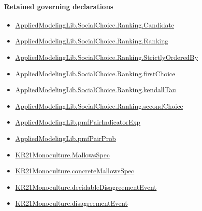 \documentclass[10pt]{article}
\begin{document}
\paragraph{Retained governing declarations}
\begin{itemize}\raggedright
\item \hyperlink{library-prerequisite-8c0e6c25845ae78a}{Applied\allowbreak{}Modeling\allowbreak{}Lib.\allowbreak{}Social\allowbreak{}Choice.\allowbreak{}Ranking.\allowbreak{}Candidate}
\item \hyperlink{library-prerequisite-5cde54446d1ae021}{Applied\allowbreak{}Modeling\allowbreak{}Lib.\allowbreak{}Social\allowbreak{}Choice.\allowbreak{}Ranking.\allowbreak{}Ranking}
\item \hyperlink{library-prerequisite-3585717d1635654a}{Applied\allowbreak{}Modeling\allowbreak{}Lib.\allowbreak{}Social\allowbreak{}Choice.\allowbreak{}Ranking.\allowbreak{}Strictly\allowbreak{}Ordered\allowbreak{}By}
\item \hyperlink{governing-declaration-08e457479ee6cf15}{Applied\allowbreak{}Modeling\allowbreak{}Lib.\allowbreak{}Social\allowbreak{}Choice.\allowbreak{}Ranking.\allowbreak{}first\allowbreak{}Choice}
\item \hyperlink{governing-declaration-127efd44d176e2ba}{Applied\allowbreak{}Modeling\allowbreak{}Lib.\allowbreak{}Social\allowbreak{}Choice.\allowbreak{}Ranking.\allowbreak{}kendall\allowbreak{}Tau}
\item \hyperlink{governing-declaration-25ac37baf58f31e2}{Applied\allowbreak{}Modeling\allowbreak{}Lib.\allowbreak{}Social\allowbreak{}Choice.\allowbreak{}Ranking.\allowbreak{}second\allowbreak{}Choice}
\item \hyperlink{governing-declaration-7bfbb69dcda546c7}{Applied\allowbreak{}Modeling\allowbreak{}Lib.\allowbreak{}pmf\allowbreak{}Pair\allowbreak{}Indicator\allowbreak{}Exp}
\item \hyperlink{governing-declaration-a60793d10cbad53d}{Applied\allowbreak{}Modeling\allowbreak{}Lib.\allowbreak{}pmf\allowbreak{}Pair\allowbreak{}Prob}
\item \hyperlink{governing-declaration-b2e6ec0602659b07}{KR21\allowbreak{}Monoculture.\allowbreak{}Mallows\allowbreak{}Spec}
\item \hyperlink{governing-declaration-0e399c7dd166853c}{KR21\allowbreak{}Monoculture.\allowbreak{}concrete\allowbreak{}Mallows\allowbreak{}Spec}
\item \hyperlink{governing-declaration-5cbdecfd9d92e1c7}{KR21\allowbreak{}Monoculture.\allowbreak{}decidable\allowbreak{}Disagreement\allowbreak{}Event}
\item \hyperlink{governing-declaration-2d73a8643b1237e4}{KR21\allowbreak{}Monoculture.\allowbreak{}disagreement\allowbreak{}Event}
\end{itemize}
\end{document}
